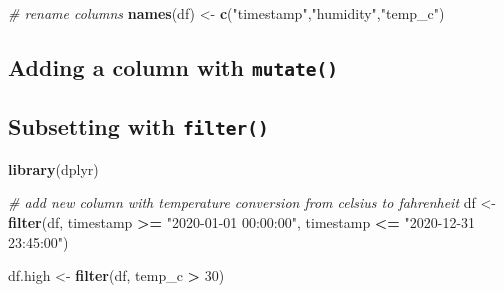 \documentclass[
  a4paperpaper,
]{book}
\newenvironment{Shaded}{\begin{snugshade}}{\end{snugshade}}
\newcommand{\CommentTok}[1]{\textcolor[rgb]{0.56,0.35,0.01}{\textit{#1}}}
\newcommand{\DataTypeTok}[1]{\textcolor[rgb]{0.13,0.29,0.53}{#1}}
\newcommand{\DecValTok}[1]{\textcolor[rgb]{0.00,0.00,0.81}{#1}}
\newcommand{\FloatTok}[1]{\textcolor[rgb]{0.00,0.00,0.81}{#1}}
\newcommand{\KeywordTok}[1]{\textcolor[rgb]{0.13,0.29,0.53}{\textbf{#1}}}
\newcommand{\NormalTok}[1]{#1}
\newcommand{\OperatorTok}[1]{\textcolor[rgb]{0.81,0.36,0.00}{\textbf{#1}}}
\newcommand{\StringTok}[1]{\textcolor[rgb]{0.31,0.60,0.02}{#1}}
\let\oldShaded\Shaded
\let\endoldShaded\endShaded
\renewenvironment{Shaded}{\footnotesize\oldShaded}{\endoldShaded}
\begin{document}
\begin{Shaded}
\begin{Highlighting}[]
\CommentTok{# rename columns}
\KeywordTok{names}\NormalTok{(df) <-}\StringTok{ }\KeywordTok{c}\NormalTok{(}\StringTok{"timestamp"}\NormalTok{,}\StringTok{"humidity"}\NormalTok{,}\StringTok{"temp_c"}\NormalTok{)}
\end{Highlighting}
\end{Shaded}

\hypertarget{adding-a-column-with-mutate}{%
\subsection{\texorpdfstring{Adding a column with \texttt{mutate()}}{Adding a column with mutate()}}\label{adding-a-column-with-mutate}}

\begin{Shaded}
\end{Shaded}

\hypertarget{subsetting-with-filter}{%
\subsection{\texorpdfstring{Subsetting with \texttt{filter()}}{Subsetting with filter()}}\label{subsetting-with-filter}}

\begin{Shaded}
\begin{Highlighting}[]
\KeywordTok{library}\NormalTok{(dplyr)}

\CommentTok{# add new column with temperature conversion from celsius to fahrenheit}
\NormalTok{df <-}\StringTok{ }\KeywordTok{filter}\NormalTok{(df,}
\NormalTok{             timestamp }\OperatorTok{>=}\StringTok{ "2020-01-01 00:00:00"}\NormalTok{,}
\NormalTok{             timestamp }\OperatorTok{<=}\StringTok{ "2020-12-31 23:45:00"}\NormalTok{)}

\NormalTok{df.high <-}\StringTok{ }\KeywordTok{filter}\NormalTok{(df, temp_c }\OperatorTok{>}\StringTok{ }\DecValTok{30}\NormalTok{)}
\end{Highlighting}
\end{Shaded}
\end{document}
